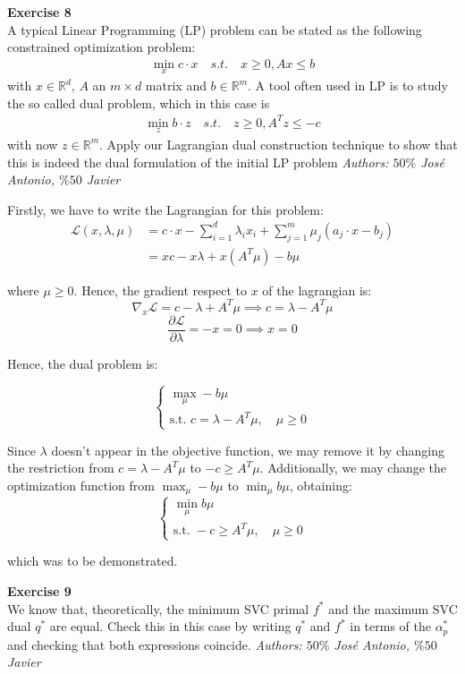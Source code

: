 \documentclass[11pt,table]{article}
\newenvironment{problem}[2][Exercise]
{ \begin{mdframed}[backgroundcolor=gray!20] \textbf{#1 #2} \\}
	{\hspace{0.0cm}\newline\newline \emph{Authors: \(50\%\) José Antonio, \(\%50\) Javier}  \end{mdframed}}
\newcommand\R{\mathbb R}
\begin{document}
\begin{problem}{8}
A typical Linear Programming (LP) problem can be stated as the following constrained optimization problem:
\begin{align*}
	\min_x c \cdot x \quad s.t. \quad x \geq 0, Ax \leq b
\end{align*}
with \(x \in \R^d\), \(A\) an \(m \times d\) matrix and \(b \in \R^m\). A tool often used in LP is to study the so called dual problem, which in this case is
\begin{align*}
	\min_{z} b \cdot z \quad s.t. \quad z \geq 0, A^T z \leq -c
\end{align*}
with now \(z \in \R^m\). Apply our Lagrangian dual construction technique to show that this is indeed the dual formulation of the initial LP problem
\end{problem}

Firstly, we have to write the Lagrangian for this problem:
\begin{align*}
	\mathcal L(x,\lambda,\mu) & = c \cdot x -  \sum_{i=1}^d \lambda_i x_i  + \sum_{j=1}^m \mu_j(a_j \cdot x - b_j) \\
	                          & = xc - x\lambda + x\left(A^T \mu\right) - b\mu
\end{align*}

where $\mu \ge 0$. Hence, the gradient respect to \(x\) of the lagrangian is:
\[
	\nabla_x \mathcal L = c - \lambda + A^T \mu \implies c = \lambda - A^T\mu
\]
\[
	\frac{\partial \mathcal L}{\partial \lambda} = -x = 0 \implies x = 0
\]

Hence, the dual problem is:

\[
	\begin{cases}
		\max_\mu - b \mu \\
		\text{s.t. } c = \lambda - A^T\mu, \quad \mu \ge 0
	\end{cases}
\]

Since $\lambda$ doesn't appear in the objective function, we may remove it by changing the restriction from $c = \lambda - A^T\mu$ to $-c \geq A^T\mu$. Additionally, we may change the optimization function from $\max_\mu - b \mu$ to $\min_\mu b \mu$, obtaining:
\[
	\begin{cases}
		\min_\mu b \mu \\
		\text{s.t. } -c \ge A^T\mu, \quad \mu \ge 0
	\end{cases}
\]

which was to be demonstrated. \\

\begin{problem}{9}
We know that, theoretically, the minimum SVC primal \(f^*\) and the maximum SVC dual \(q^*\) are equal. Check this in this case by writing \(q^*\) and \(f^*\) in terms of the \(\alpha_p^*\) and checking that both expressions coincide.
\end{problem}
\end{document}

